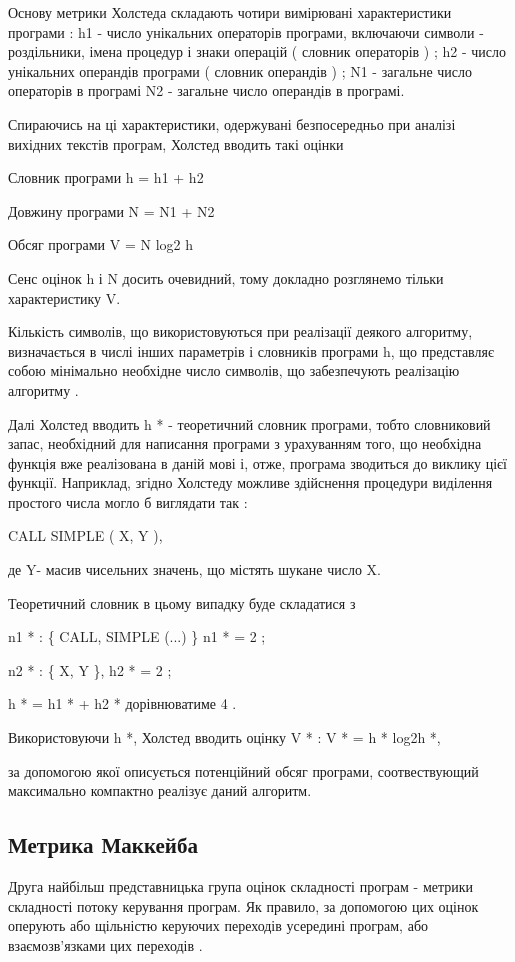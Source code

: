 Основу метрики Холстеда складають чотири вимірювані характеристики програми : h1 - число унікальних операторів програми, включаючи символи - роздільники, імена процедур і знаки операцій ( словник операторів ) ; h2 - число унікальних операндів програми ( словник операндів ) ; N1 - загальне число операторів в програмі N2 - загальне число операндів в програмі.

Спираючись на ці характеристики, одержувані безпосередньо при аналізі вихідних текстів програм, Холстед вводить такі оцінки

Словник програми h = h1 + h2

Довжину програми N = N1 + N2

Обсяг програми V = N log2 h

Сенс оцінок h і N досить очевидний, тому докладно розглянемо тільки характеристику V.

Кількість символів, що використовуються при реалізації деякого алгоритму, визначається в числі інших параметрів і словників програми h, що представляє собою мінімально необхідне число символів, що забезпечують реалізацію алгоритму .

Далі Холстед вводить h * - теоретичний словник програми, тобто словниковий запас, необхідний для написання програми з урахуванням того, що необхідна функція вже реалізована в даній мові і, отже, програма зводиться до виклику цієї функції. Наприклад, згідно Холстеду можливе здійснення процедури виділення простого числа могло б виглядати так :

CALL SIMPLE ( X, Y ),

де Y- масив чисельних значень, що містять шукане число X.

Теоретичний словник в цьому випадку буде складатися з

n1 * : \{ CALL, SIMPLE (...) \} n1 * = 2 ;

n2 * : \{ X, Y \}, h2 * = 2 ;

h * = h1 * + h2 * дорівнюватиме 4 .

Використовуючи h *, Холстед вводить оцінку V * : V * = h * log2h *,

за допомогою якої описується потенційний обсяг програми, соотвествующий максимально компактно реалізує даний алгоритм.


\subsection{Метрика Маккейба}
\label{2section:id11}
Друга найбільш представницька група оцінок складності програм - метрики складності потоку керування програм. Як правило, за допомогою цих оцінок оперують або щільністю керуючих переходів усередині програм, або взаємозв'язками цих переходів .

